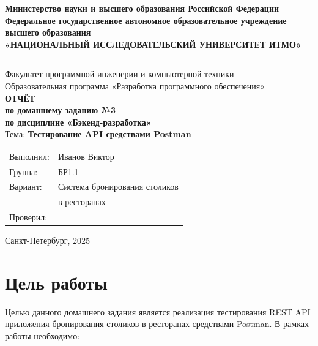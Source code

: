 \documentclass[a4paper,14pt]{extarticle}
\begin{document}
\begin{titlepage}
  \begin{center}
    \textbf{Министерство науки и высшего образования Российской Федерации}\\[0.3cm]
    \textbf{Федеральное государственное автономное образовательное учреждение\\
    высшего образования}\\[0.3cm]
    \textbf{«НАЦИОНАЛЬНЫЙ ИССЛЕДОВАТЕЛЬСКИЙ УНИВЕРСИТЕТ ИТМО»}\\[0.5cm]
    \hrule
    \vspace{0.3cm}
    Факультет программной инженерии и компьютерной техники\\[0.2cm]
    Образовательная программа «Разработка программного обеспечения»\\[2cm]

    \large\textbf{ОТЧЁТ}\\[0.3cm]
    \textbf{по домашнему заданию №3}\\[0.3cm]
    \textbf{по дисциплине «Бэкенд-разработка»}\\[0.5cm]
    \normalsize Тема: \textbf{Тестирование API средствами Postman}\\[3cm]

    \begin{flushright}
      \begin{tabular}{ll}
        Выполнил: & Иванов Виктор\\
        Группа:   & БР1.1\\
        Вариант:  & Система бронирования столиков\\
                  & в ресторанах\\[0.5cm]
        Проверил: & \\
      \end{tabular}
    \end{flushright}

    \vfill
    Санкт-Петербург, 2025
  \end{center}
\end{titlepage}

\tableofcontents
\newpage

\section{Цель работы}

Целью данного домашнего задания является реализация тестирования REST API приложения
бронирования столиков в ресторанах средствами Postman. В рамках работы необходимо:
\end{document}
